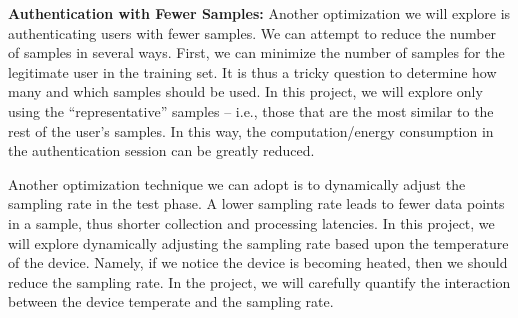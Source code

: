 \vspace{4pt}\textbf{Authentication with Fewer Samples:} Another optimization we will explore is authenticating users with fewer samples. We can attempt to reduce the number of samples in several ways. First, we can minimize the number of samples for the legitimate user in the training set. It is thus a tricky question to determine how many and which samples should be used. In this project, we will explore only using the ``representative'' samples -- i.e., those that are the most similar to the rest of the user's samples. In this way, the computation/energy consumption in the authentication session can be greatly reduced.

Another optimization technique we can adopt is to dynamically adjust the sampling rate in the test phase. A lower sampling rate leads to fewer data points in a sample, thus shorter collection and processing latencies. In this project, we will explore dynamically adjusting the sampling rate based upon the temperature of the device. Namely, if we notice the device is becoming heated, then we should reduce the sampling rate. In the project, we will carefully quantify the interaction between the device temperate and the sampling rate.

